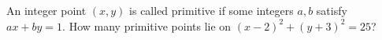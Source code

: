 An integer point $(x,y)$ is called primitive if some integers $a,b$ satisfy $ax+by=1$. How many primitive points lie on $(x-2)^2+(y+3)^2=25$?
